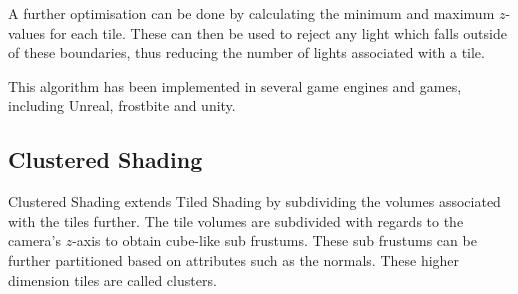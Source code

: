 A further optimisation can be done by calculating the minimum and maximum
$z$-values for each tile. These can then be used to reject any light which falls
outside of these boundaries, thus reducing the number of lights associated with
a tile.

This algorithm has been implemented in several game engines and
games\cite{balestra2008technology, swoboda2009deferred, balestra2008technology},
including Unreal\cite{karis2013real},
frostbite\cite{andersson2009parallel, magnusson2011lighting}
and unity\cite{pranckevivcius2014physically}.




\subsection{Clustered Shading}

Clustered Shading\cite{olsson2012clustered} extends Tiled Shading by subdividing the
volumes associated with the tiles further. The tile volumes are subdivided with regards to the
camera's $z$-axis to obtain cube-like sub frustums. These sub frustums can be further
partitioned based on attributes such as the normals. These higher dimension tiles are
called clusters.


